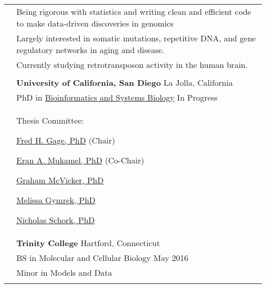 \documentclass[letterpaper, 11pt]{article}
\begin{document}
\begin{longtable}{p{1.6in}p{4.9in}}


\nohyphens{\color{OliveGreen}{Research interests}}
& Being rigorous with statistics and writing clean and efficient code to make data-driven discoveries in genomics \\
& Largely interested in somatic mutations, repetitive DNA, and gene regulatory networks in aging and disease. \\ 
& Currently studying retrotransposon activity in the human brain. \\
& \\


\color{OliveGreen}{Education} 
& \textbf{University of California, San Diego} \hfill La Jolla, California \\ 
& PhD in \href{https://bioinformatics.ucsd.edu/}{Bioinformatics and Systems Biology} \hfill In Progress \\
& Thesis Committee:
\begin{compactitem}
\item \href{https://www.salk.edu/scientist/rusty-gage/}{Fred H. Gage, PhD} (Chair)
\item \href{https://cogsci.ucsd.edu/people/faculty/eran-mukamel.html}{Eran A. Mukamel, PhD} (Co-Chair)
\item \href{https://www.salk.edu/scientist/graham-mcvicker/}{Graham McVicker, PhD}
\item \href{https://profiles.ucsd.edu/melissa.gymrek}{Melissa Gymrek, PhD}
\item \href{https://www.tgen.org/faculty-profiles/nik-schork/}{Nicholas Schork, PhD}
\end{compactitem} \\


& \textbf{Trinity College} \hfill Hartford, Connecticut \\
& BS in Molecular and Cellular Biology \hfill May 2016 \\
& Minor in Models and Data \\
& \\



\end{longtable}
\end{document}
